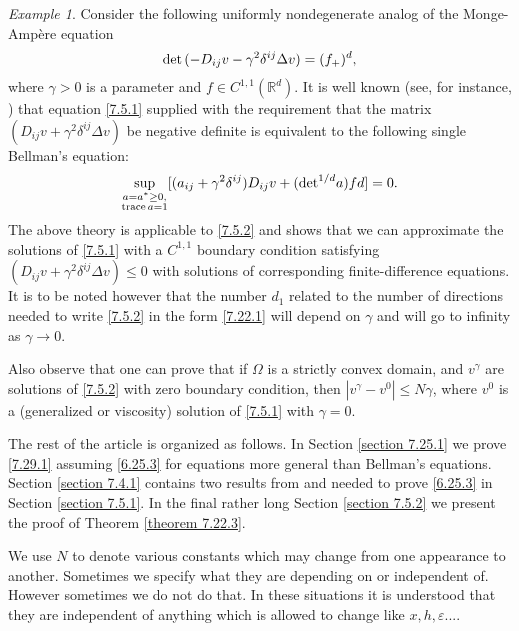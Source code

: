 \documentclass[11pt, reqno]{amsart}
\theoremstyle{definition}
\theoremstyle{remark}
\newtheorem{example}{Example}[section]
\begin{document}
\begin{example}
Consider the following uniformly nondegenerate analog
of the Monge-Amp\`ere equation
\begin{equation}
                                                  \label{7.5.1}
{\rm det}\,(-D_{ij}v-\gamma^{2}\delta^{ij}\Delta v)=
(f_{+})^{d},
\end{equation}
where $\gamma>0$ is a parameter and $f\in C^{1,1}({\mathbb{R}}^{d})$.
It is well known (see, for instance, \cite{Kr72}) 
that equation \eqref{7.5.1} supplied with the requirement
that the matrix $( D_{ij}v+\gamma^{2}\delta^{ij}\Delta v)$
be negative definite is equivalent to the following
single Bellman's equation:
\begin{equation}
                                                  \label{7.5.2}
\sup_{\substack{a=a^{*}\geq0,\\{\rm trace}\, a=1}}
[(a_{ij}+\gamma^{2}\delta^{ij})D_{ij}v+
({\rm det}^{1/d}a)fd]=0.
\end{equation}
The above theory is applicable to \eqref{7.5.2} and
shows that we can approximate the solutions of
\eqref{7.5.1} with a $C^{1,1}$ boundary
condition satisfying $( D_{ij}v+\gamma^{2}\delta^{ij}\Delta v)
\leq0$ with solutions of corresponding finite-difference
equations. It is to be noted however that
the number $d_{1}$ related to the number
of directions needed to write \eqref{7.5.2}
in the form \eqref{7.22.1} will depend on $\gamma$ and will go
to infinity as $\gamma\to0$.

Also observe that one can prove that if $\Omega$
is a strictly convex domain, and $v^{\gamma}$
are solutions of \eqref{7.5.2} with zero boundary condition,
 then $|v^{\gamma}-v^{0}|
\leq N\gamma$, where $v^{0}$ is a (generalized or viscosity)
 solution of
\eqref{7.5.1} with $\gamma=0$.
\end{example}

The rest of the article is organized as follows.
In Section \ref{section 7.25.1} we prove
\eqref{7.29.1} assuming \eqref{6.25.3} for equations
more general than Bellman's equations.
Section \ref{section 7.4.1} contains two
results from \cite{Kr12.1} and 
 \cite{Kr12.2} needed to prove 
\eqref{6.25.3} in Section \ref{section 7.5.1}.
In the final rather long Section \ref{section 7.5.2}
we present the proof of Theorem \ref{theorem 7.22.3}.
                                           

We use $N$ to denote various constants which may change from one
appearance to another. Sometimes we specify what they
are depending on or independent of. However sometimes 
we do not do that.
In these situations it is understood that they
are independent of anything which is allowed to change
like $x,h,\varepsilon$....
\end{document}
